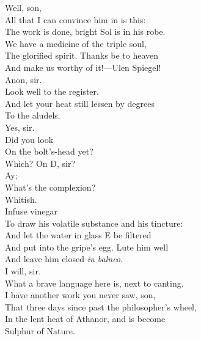 \documentclass[a4paper,oneside,12pt]{memoir}
\begin{document}
\begin{drama*}
\subtlespeaks {} Well, son,\\
All that I can convince him in is this:\\
The work is done, bright Sol is in his robe.\\
We have a medicine of the triple soul,\\
The glorified spirit. Thanks be to heaven\\
And make us worthy of it!---Ulen Spiegel!\\
\facespeaks {} Anon, sir.\\
\subtlespeaks {} Look well to the register.\\
And let your heat still lessen by degrees\\
To the aludels.\\
\facespeaks {} Yes, sir.\\
\subtlespeaks {} Did you look\\
On the bolt's-head yet?\\
\facespeaks {} Which? On D, sir?\\
\subtlespeaks {} Ay;\\
What's the complexion?\\
\facespeaks {} Whitish.\\
\subtlespeaks {} Infuse vinegar\\
To draw his volatile substance and his tincture:\\
And let the water in glass E be filtered\\
And put into the gripe's egg. Lute him well\\
And leave him closed \emph{in balneo}.\\
\facespeaks {} I will, sir.\\
\surlyspeaks What a brave language here is, next to canting.\\
\subtlespeaks I have another work you never saw, son,\\
That three days since past the philosopher's wheel,\\
In the lent heat of Athanor, and is become\\
Sulphur of Nature.\\

\end{drama*}
\end{document}

